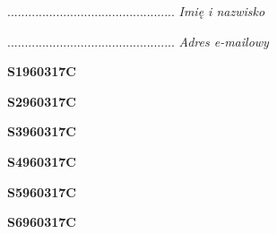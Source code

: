\begin{turn}{90}\begin{minipage}{\linewidth} \vspace{20mm} ................................................  \textit{Imię i nazwisko}\end{minipage}\end{turn}

\begin{turn}{90}\begin{minipage}{\linewidth} \vspace{20mm} ................................................  \textit{Adres e-mailowy}\end{minipage}\end{turn}

\begin{turn}{90}\huge \begin{minipage}{\linewidth} \vspace{10mm}\textbf{S1960317C}\end{minipage}\end{turn}

\begin{turn}{90}\huge \begin{minipage}{\linewidth} \vspace{10mm}\textbf{S2960317C}\end{minipage}\end{turn}

\begin{turn}{90}\huge \begin{minipage}{\linewidth} \vspace{10mm}\textbf{S3960317C}\end{minipage}\end{turn}

\begin{turn}{90}\huge \begin{minipage}{\linewidth} \vspace{10mm}\textbf{S4960317C}\end{minipage}\end{turn}

\begin{turn}{90}\huge \begin{minipage}{\linewidth} \vspace{10mm}\textbf{S5960317C}\end{minipage}\end{turn}

\begin{turn}{90}\huge \begin{minipage}{\linewidth} \vspace{10mm}\textbf{S6960317C}\end{minipage}\end{turn}

